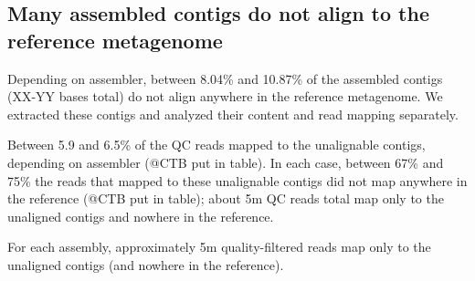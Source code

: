 \documentclass[10pt,a4paper,twocolumn]{article}
\begin{document}


\subsection*{Many assembled contigs do not align to the reference metagenome}

Depending on assembler, between 8.04\% and 10.87\% of the assembled
contigs (XX-YY bases total) do not align anywhere in the reference
metagenome.  We extracted these contigs and analyzed their content and
read mapping separately.

Between 5.9 and 6.5\% of the QC reads mapped to the unalignable
contigs, depending on assembler (@CTB put in table).  In each case,
between 67\% and 75\% the reads that mapped to these unalignable
contigs did not map anywhere in the reference (@CTB put in table); about 5m
QC reads total map only to the unaligned contigs and nowhere in the
reference.

For
each assembly, approximately 5m quality-filtered reads map only to the
unaligned contigs (and nowhere in the reference).


\end{document}
